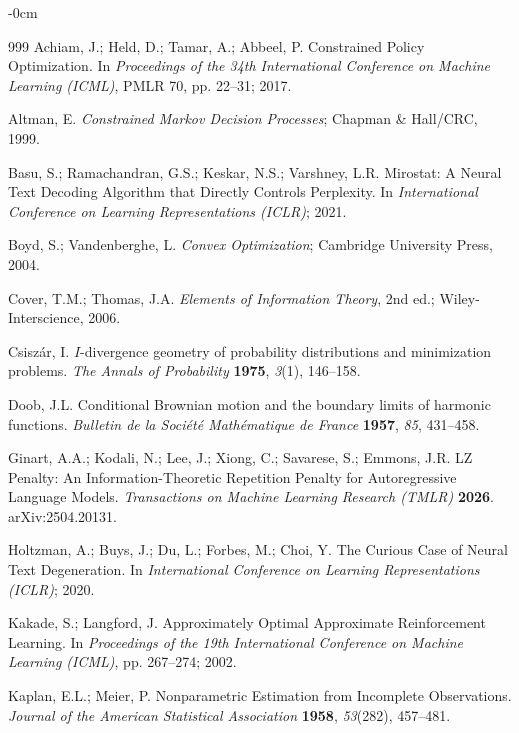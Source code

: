 \documentclass[make,article,submit,pdftex]{Definitions/mdpi}
\begin{document}
\begin{adjustwidth}{-\extralength}{0cm}
\begin{thebibliography}{999}
Achiam, J.; Held, D.; Tamar, A.; Abbeel, P. Constrained Policy Optimization. In \textit{Proceedings of the 34th International Conference on Machine Learning (ICML)}, PMLR 70, pp. 22--31; 2017.

Altman, E. \textit{Constrained {M}arkov Decision Processes}; Chapman \& Hall/CRC, 1999.

Basu, S.; Ramachandran, G.S.; Keskar, N.S.; Varshney, L.R. Mirostat: A Neural Text Decoding Algorithm that Directly Controls Perplexity. In \textit{International Conference on Learning Representations (ICLR)}; 2021.

Boyd, S.; Vandenberghe, L. \textit{Convex Optimization}; Cambridge University Press, 2004.

Cover, T.M.; Thomas, J.A. \textit{Elements of Information Theory}, 2nd ed.; Wiley-Interscience, 2006.

Csisz{\'a}r, I. {$I$}-divergence geometry of probability distributions and minimization problems. \textit{The Annals of Probability} \textbf{1975}, \textit{3}(1), 146--158.

Doob, J.L. Conditional {B}rownian motion and the boundary limits of harmonic functions. \textit{Bulletin de la Soci{\'e}t{\'e} Math{\'e}matique de France} \textbf{1957}, \textit{85}, 431--458.

Ginart, A.A.; Kodali, N.; Lee, J.; Xiong, C.; Savarese, S.; Emmons, J.R. {LZ} Penalty: An Information-Theoretic Repetition Penalty for Autoregressive Language Models. \textit{Transactions on Machine Learning Research (TMLR)} \textbf{2026}. arXiv:2504.20131.

Holtzman, A.; Buys, J.; Du, L.; Forbes, M.; Choi, Y. The Curious Case of Neural Text Degeneration. In \textit{International Conference on Learning Representations (ICLR)}; 2020.

Kakade, S.; Langford, J. Approximately Optimal Approximate Reinforcement Learning. In \textit{Proceedings of the 19th International Conference on Machine Learning (ICML)}, pp. 267--274; 2002.

Kaplan, E.L.; Meier, P. Nonparametric Estimation from Incomplete Observations. \textit{Journal of the American Statistical Association} \textbf{1958}, \textit{53}(282), 457--481.


\end{thebibliography}
\end{adjustwidth}
\end{document}

